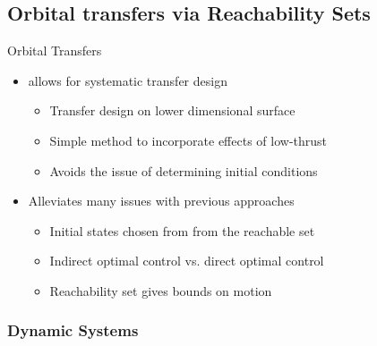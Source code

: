 
\subsection[Reachability Sets]{Orbital transfers via Reachability Sets}

\begin{frame}{Orbital Transfers} %
    \begin{itemize}
        \item {} allows for systematic transfer design
        \begin{itemize}
            \item Transfer design on lower dimensional \Poincare surface
            \item Simple method to incorporate effects of low-thrust 
            \item Avoids the issue of determining initial conditions
        \end{itemize}
    \pause
        \item Alleviates many issues with previous approaches
        \begin{itemize}
            \item Initial states chosen from from the reachable set
            \item Indirect optimal control vs. direct optimal control
            \item Reachability set gives bounds on motion
        \end{itemize}    
    \end{itemize}

\end{frame} %

\subsubsection[Dynamic Systems Theory]{Dynamic Systems}

